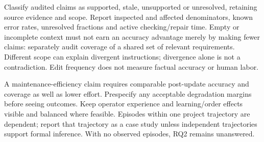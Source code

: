 Classify audited claims as supported, stale, unsupported or unresolved, retaining
source evidence and scope. Report inspected and affected denominators, known
error rates, unresolved fractions and active checking/repair time. Empty or
incomplete context must not earn an accuracy advantage merely by making fewer
claims: separately audit coverage of a shared set of relevant requirements.
Different scope can explain divergent instructions; divergence alone is not a
contradiction. Edit frequency does not measure factual accuracy or human labor.

A maintenance-efficiency claim requires comparable post-update accuracy and
coverage as well as lower effort. Prespecify any acceptable degradation margins
before seeing outcomes. Keep operator experience and learning/order effects
visible and balanced where feasible. Episodes within one project trajectory
are dependent; report that trajectory as a case study unless independent
trajectories support formal inference. With no observed episodes, RQ2 remains
unanswered.
